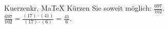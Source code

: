 \begin{MAufgabe}{Kuerzen}{kr, MaTeX}
K\"urzen Sie soweit m\"oglich: $\frac{697}{102}$.\\ 
\ifLsg\MLoesung
\quad $\frac{697}{102}=\frac{(17)\cdot(41)}{(17)\cdot(6)}=\frac{41}{6}$.\else\relax\fi
 \end{MAufgabe}